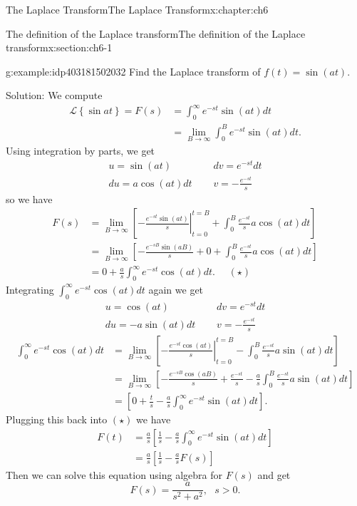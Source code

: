 \documentclass[oneside,10pt,]{book}
\numberwithin{equation}{section}
\numberwithin{equation}{section}
\newcommand{\amp}{&}
\begin{document}
\begin{chapterptx}{The Laplace Transform}{}{The Laplace Transform}{}{}{x:chapter:ch6}
\begin{sectionptx}{The definition of the Laplace transform}{}{The definition of the Laplace transform}{}{}{x:section:ch6-1}
\begin{example}{}{g:example:idp403181502032}
Find the Laplace transform of \(f(t)=\sin(at)\).%
\par
Solution: We compute%
\begin{align*}
\mathcal{L}\left\{ \sin at\right\} =F(s) \amp =\int_{0}^{\infty}e^{-st}\sin(at)dt\\
\amp =\lim_{B\to\infty}\int_{0}^{B}e^{-st}\sin(at)dt.
\end{align*}
Using integration by parts, we get%
\begin{align*}
u=\sin(at)\,\,\,\,\,\,\,\, \amp dv=e^{-st}dt\\
du=a\cos(at)dt\,\,\,\,\,\,\,\, \amp v=-\frac{e^{-st}}{s}
\end{align*}
so we have%
\begin{align*}
F(s) \amp =\lim_{B\to\infty}\left[\left.-\frac{e^{-st}\sin(at)}{s}\right|_{t=0}^{t=B}+\int_{0}^{B}\frac{e^{-st}}{s}a\cos(at)dt\right]\\
\amp =\lim_{B\to\infty}\left[-\frac{e^{-sB}\sin(aB)}{s}+0+\int_{0}^{B}\frac{e^{-st}}{s}a\cos(at)dt\right]\\
\amp =0+\frac{a}{s}\int_{0}^{\infty}e^{-st}\cos(at)dt.\,\,\,\,\,\,\,\,(\star)
\end{align*}
Integrating \(\int_{0}^{\infty}e^{-st}\cos(at)dt\) again we get%
\begin{align*}
u=\cos(at)\,\,\,\,\,\,\,\, \amp dv=e^{-st}dt\\
du=-a\sin(at)dt\,\,\,\,\,\,\,\, \amp v=-\frac{e^{-st}}{s}
\end{align*}
%
\begin{align*}
\int_{0}^{\infty}e^{-st}\cos(at)dt \amp =\lim_{B\to\infty}\left[\left.-\frac{e^{-st}\cos(at)}{s}\right|_{t=0}^{t=B}-\int_{0}^{B}\frac{e^{-st}}{s}a\sin(at)dt\right]\\
\amp =\lim_{B\to\infty}\left[-\frac{e^{-sB}\cos(aB)}{s}+\frac{e^{-st}}{s}-\frac{a}{s}\int_{0}^{B}\frac{e^{-st}}{s}a\sin(at)dt\right]\\
\amp =\left[0+\frac{t}{s}-\frac{a}{s}\int_{0}^{\infty}e^{-st}\sin(at)dt\right].
\end{align*}
Plugging this back into \((\star)\) we have%
\begin{align*}
F(t) \amp =\frac{a}{s}\left[\frac{1}{s}-\frac{a}{s}\int_{0}^{\infty}e^{-st}\sin(at)dt\right]\\
\amp =\frac{a}{s}\left[\frac{1}{s}-\frac{a}{s}F(s)\right]
\end{align*}
Then we can solve this equation using algebra for \(F(s)\) and get%
\begin{equation*}
F(s)=\frac{a}{s^{2}+a^{2}},\,\,\,\,s>0.

\end{equation*}
\end{example}
\end{sectionptx}
\end{chapterptx}
\end{document}

